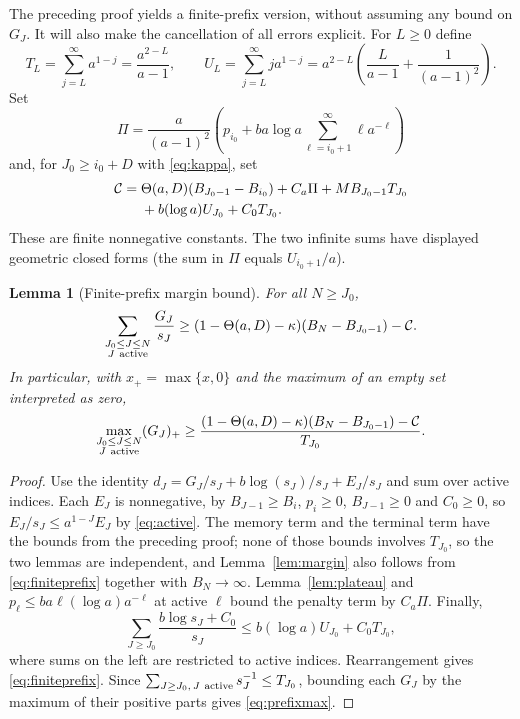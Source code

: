 \documentclass[11pt]{amsart}
\newtheorem{lemma}[theorem]{Lemma}
\theoremstyle{remark}\newtheorem{remark}[theorem]{Remark}
\begin{document}
The preceding proof yields a finite-prefix version, without assuming any
bound on $G_J$. It will also make the cancellation of all errors explicit.
For $L\ge0$ define
\[
 T_L=\sum_{j=L}^{\infty}a^{1-j}=\frac{a^{2-L}}{a-1},\qquad
 U_L=\sum_{j=L}^{\infty}j a^{1-j}
 =a^{2-L}\left(\frac{L}{a-1}+\frac1{(a-1)^2}\right).
\]
Set
\[
 \Pi=\frac{a}{(a-1)^2}
   \left(p_{i_0}+ba\log a\sum_{\ell=i_0+1}^{\infty}\ell a^{-\ell}\right)
\]
and, for $J_0\ge i_0+D$ with \eqref{eq:kappa}, set
\begin{align}
 \mathcal C={}&\Theta(a,D)(B_{J_0-1}-B_{i_0})+C_a\Pi
       +MB_{J_0-1}T_{J_0}\notag\\
       &+b(\log a)U_{J_0}+C_0T_{J_0}.\label{eq:explicitC}
\end{align}
These are finite nonnegative constants. The two infinite sums have displayed
geometric closed forms (the sum in $\Pi$ equals $U_{i_0+1}/a$).

\begin{lemma}[Finite-prefix margin bound]\label{lem:prefix}
For all $N\ge J_0$,
\begin{equation}\label{eq:finiteprefix}
 \sum_{\substack{J_0\le J\le N\\J\ {\rm active}}}\frac{G_J}{s_J}
 \ge(1-\Theta(a,D)-\kappa)(B_N-B_{J_0-1})-\mathcal C.
\end{equation}
In particular, with $x_+=\max\{x,0\}$ and the maximum of an empty set
interpreted as zero,
\begin{equation}\label{eq:prefixmax}
 \max_{\substack{J_0\le J\le N\\J\ {\rm active}}}(G_J)_+
 \ge\frac{(1-\Theta(a,D)-\kappa)(B_N-B_{J_0-1})-\mathcal C}{T_{J_0}}.
\end{equation}
\end{lemma}

\begin{proof}
Use the identity
$d_J=G_J/s_J+b\log(s_J)/s_J+E_J/s_J$ and sum over active indices. Each $E_J$
is nonnegative, by $B_{J-1}\ge B_i$, $p_i\ge0$, $B_{J-1}\ge0$ and $C_0\ge0$, so
$E_J/s_J\le a^{1-J}E_J$ by \eqref{eq:active}. The memory term and the terminal
term have the bounds from the preceding proof; none of those bounds involves
$T_{J_0}$, so the two lemmas are independent, and Lemma~\ref{lem:margin} also
follows from \eqref{eq:finiteprefix} together with $B_N\to\infty$. Lemma~\ref{lem:plateau} and
$p_\ell\le ba\ell(\log a)a^{-\ell}$ at active $\ell$ bound the penalty
term by $C_a\Pi$. Finally,
\[
 \sum_{J\ge J_0}\frac{b\log s_J+C_0}{s_J}
 \le b(\log a)U_{J_0}+C_0T_{J_0},
\]
where sums on the left are restricted to active indices. Rearrangement
gives \eqref{eq:finiteprefix}. Since
$\sum_{J\ge J_0,\,J\ {\rm active}}s_J^{-1}\le T_{J_0}$, bounding each
$G_J$ by the maximum of their positive parts gives \eqref{eq:prefixmax}.
\end{proof}
\end{document}
